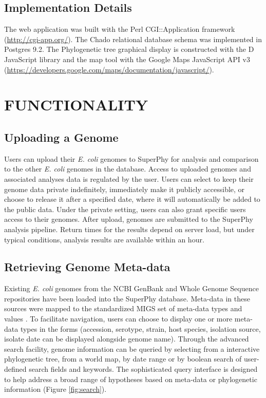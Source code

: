 \documentclass[a4paper,twoside]{article}
\begin{document}
\subsection{Implementation Details}

The web application was built with the Perl CGI::Application framework (\url{http://cgi-app.org/}). The Chado relational database schema was implemented in Postgres 9.2. The Phylogenetic tree graphical display is constructed with the D JavaScript library \cite{bostock2011d3} and the map tool with the Google Maps JavaScript API v3 (\url{https://developers.google.com/maps/documentation/javascript/}).

\section{\uppercase{Functionality}}
\label{sec:functionality}

\subsection{Uploading a Genome}

Users can upload their \textit{E. coli} genomes to SuperPhy for analysis and comparison to the other \textit{E. coli} genomes in the database.  Access to uploaded genomes and associated analyses data is regulated by the user. Users can select to keep their genome data private indefinitely, immediately make it publicly accessible, or choose to release it after a specified date, where it will automatically be added to the public data.  Under the private setting, users can also grant specific users access to their genomes. After upload, genomes are submitted to the SuperPhy analysis pipeline. Return times for the results depend on server load, but under typical conditions, analysis results are available within an hour.

\subsection{Retrieving Genome Meta-data}

Existing \textit{E. coli} genomes from the NCBI GenBank and Whole Genome Sequence repositories \cite{benson2013genbank} have been loaded into the SuperPhy database. Meta-data in these sources were mapped to the standardized MIGS set of meta-data types and values \cite{field2008}. To facilitate navigation, users can choose to display one or more meta-data types in the forms (accession, serotype, strain, host species, isolation source, isolate date can be displayed alongside genome name). Through the advanced search facility, genome information can be queried by selecting from a interactive phylogenetic tree, from a world map, by date range or by boolean search of user-defined search fields and keywords.  The sophisticated query interface is designed to help address a broad range of hypotheses based on meta-data or phylogenetic information (Figure \ref{fig:search}).
\end{document}
